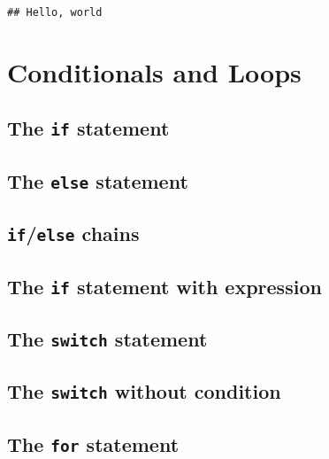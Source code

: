 \documentclass[]{book}
\begin{document}
\begin{verbatim}
## Hello, world
\end{verbatim}

\hypertarget{conditionals-and-loops}{%
\chapter{Conditionals and Loops}\label{conditionals-and-loops}}

\hypertarget{the-if-statement}{%
\section{\texorpdfstring{The \texttt{if} statement}{The if statement}}\label{the-if-statement}}

\hypertarget{the-else-statement}{%
\section{\texorpdfstring{The \texttt{else} statement}{The else statement}}\label{the-else-statement}}

\hypertarget{ifelse-chains}{%
\section{\texorpdfstring{\texttt{if}/\texttt{else} chains}{if/else chains}}\label{ifelse-chains}}

\hypertarget{the-if-statement-with-expression}{%
\section{\texorpdfstring{The \texttt{if} statement with expression}{The if statement with expression}}\label{the-if-statement-with-expression}}

\hypertarget{the-switch-statement}{%
\section{\texorpdfstring{The \texttt{switch} statement}{The switch statement}}\label{the-switch-statement}}

\hypertarget{the-switch-without-condition}{%
\section{\texorpdfstring{The \texttt{switch} without condition}{The switch without condition}}\label{the-switch-without-condition}}

\hypertarget{the-for-statement}{%
\section{\texorpdfstring{The \texttt{for} statement}{The for statement}}\label{the-for-statement}}
\end{document}

